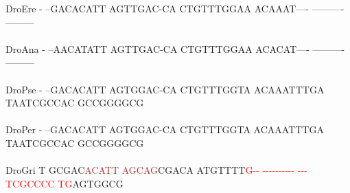 \documentclass[11pt,twoside,reqno,a4paper]{article}
\begin{document}
{DroEre	-	--GACACATT	AGTTGAC-CA	CTGTTTGGAA	ACAAAT----	----------	---------\\
\hspace*{7\charwidth}\hspace*{1\charwidth}\hspace*{1\charwidth}\hspace*{1\charwidth}\hspace*{1\charwidth}\hspace*{1\charwidth}\hspace*{1\charwidth}\\
DroAna	-	--AACATATT	AGTTGAC-CA	CTGTTTGGAA	ACACAT----	----------	---------\\
\hspace*{7\charwidth}\hspace*{1\charwidth}\hspace*{1\charwidth}\hspace*{1\charwidth}\hspace*{1\charwidth}\hspace*{1\charwidth}\hspace*{1\charwidth}\\
DroPse	-	--GACACATT	AGTGGAC-CA	CTGTTTGGTA	ACAAATTTGA	TAATCGCCAC	GCCGGGGCG\\
\hspace*{7\charwidth}\hspace*{1\charwidth}\hspace*{1\charwidth}\hspace*{1\charwidth}\hspace*{1\charwidth}\hspace*{1\charwidth}\hspace*{1\charwidth}\\
DroPer	-	--GACACATT	AGTGGAC-CA	CTGTTTGGTA	ACAAATTTGA	TAATCGCCAC	GCCGGGGCG\\
\hspace*{7\charwidth}\hspace*{1\charwidth}\hspace*{1\charwidth}\hspace*{1\charwidth}\hspace*{1\charwidth}\hspace*{1\charwidth}\hspace*{1\charwidth}\\
DroGri	T	GCGAC\textcolor{Brown}{A}\textcolor{Brown}{C}\textcolor{Brown}{A}\textcolor{Brown}{T}\textcolor{Brown}{T}	\textcolor{Brown}{A}\textcolor{Brown}{G}\textcolor{Brown}{C}\textcolor{Brown}{A}\textcolor{Brown}{G}CGACA	ATGTTTT\textcolor{Red}{G}\textcolor{Red}{-}\textcolor{Red}{-}	\textcolor{Red}{-}\textcolor{Red}{-}\textcolor{Red}{-}\textcolor{Red}{-}\textcolor{Red}{-}\textcolor{Red}{-}\textcolor{Red}{-}\textcolor{Red}{-}\textcolor{Red}{-}\textcolor{Red}{-}	\textcolor{Red}{-}\textcolor{Red}{-}\textcolor{Red}{-}\textcolor{Red}{T}\textcolor{Red}{C}\textcolor{Red}{G}\textcolor{Red}{C}\textcolor{Red}{C}\textcolor{Red}{C}\textcolor{Red}{C}	\textcolor{Red}{T}\textcolor{Red}{G}AGTGGCG\\
}
\end{document}
